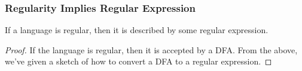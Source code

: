 \documentclass[letterpaper]{article}
\begin{document}
\subsubsection{Regularity Implies Regular Expression}

\begin{lemma}{}{}
    If a language is regular, then it is described by some regular expression.
\end{lemma}

\begin{mdframed}[]
    \begin{proof}
        If the language is regular, then it is accepted by a DFA. From the above, we've given a sketch of how to convert a DFA to a regular expression. 
    \end{proof}
\end{mdframed}
\end{document}
